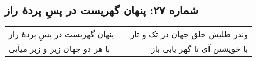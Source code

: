 \begin{center}
\section*{شماره ۲۷: پنهان گهریست در پسِ پردۀ راز}
\label{sec:027}
\begin{longtable}{l p{0.5cm} r}
پنهان گهریست در پسِ پردهٔ راز
&&
وندر طلبش خلق جهان در تک و تاز
\\
با هر دو جهان زیر و زبر میآیی
&&
با خویشتن آی تا گهر یابی باز
\\
\end{longtable}
\end{center}
